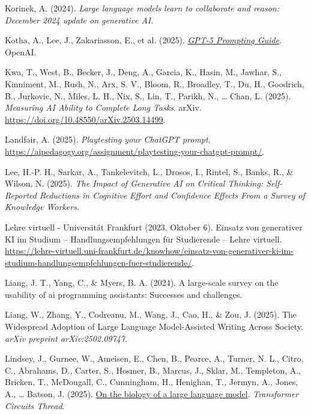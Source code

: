 \documentclass[
  ngerman,
  letterpaper,
  DIV=11]{scrreprt}
\newlength{\cslhangindent}
\newenvironment{CSLReferences}[2] %
 {\begin{list}{}{%
  \setlength{\itemindent}{0pt}
  \setlength{\leftmargin}{0pt}
  \setlength{\parsep}{0pt}
  \ifodd #1
   \setlength{\leftmargin}{\cslhangindent}
   \setlength{\itemindent}{-1\cslhangindent}
  \fi
  \setlength{\itemsep}{#2\baselineskip}}}
 {\end{list}}
\begin{document}
\begin{CSLReferences}{1}{0}
Korinek, A. (2024). \emph{Large language models learn to collaborate and
reason: December 2024 update on generative AI}.

Kotha, A., Lee, J., Zakariasson, E., et al. (2025).
\emph{\href{https://cookbook.openai.com/examples/gpt-5/gpt-5_prompting_guide}{GPT-5
Prompting Guide}}. OpenAI.

Kwa, T., West, B., Becker, J., Deng, A., Garcia, K., Hasin, M., Jawhar,
S., Kinniment, M., Rush, N., Arx, S. V., Bloom, R., Broadley, T., Du,
H., Goodrich, B., Jurkovic, N., Miles, L. H., Nix, S., Lin, T., Parikh,
N., \ldots{} Chan, L. (2025). \emph{Measuring AI Ability to Complete
Long Tasks}. arXiv. \url{https://doi.org/10.48550/arXiv.2503.14499}.

Landfair, A. (2025). \emph{Playtesting your ChatGPT prompt}.
\url{https://aipedagogy.org/assignment/playtesting-your-chatgpt-prompt/}.

Lee, H.-P. H., Sarkar, A., Tankelevitch, L., Drosos, I., Rintel, S.,
Banks, R., \& Wilson, N. (2025). \emph{The Impact of Generative AI on
Critical Thinking: Self-Reported Reductions in Cognitive Effort and
Confidence Effects From a Survey of Knowledge Workers}.

Lehre virtuell - Universität Frankfurt (2023, Oktober 6). Einsatz von
generativer KI im Studium -- Handlungsempfehlungen für Studierende --
Lehre virtuell.
\url{https://lehre-virtuell.uni-frankfurt.de/knowhow/einsatz-von-generativer-ki-im-studium-handlungsempfehlungen-fuer-studierende/}.

Liang, J. T., Yang, C., \& Myers, B. A. (2024). A large-scale survey on
the usability of ai programming assistants: Successes and challenges.

Liang, W., Zhang, Y., Codreanu, M., Wang, J., Cao, H., \& Zou, J.
(2025). The Widespread Adoption of Large Language Model-Assisted Writing
Across Society. \emph{arXiv preprint arXiv:2502.09747}.

Lindsey, J., Gurnee, W., Ameisen, E., Chen, B., Pearce, A., Turner, N.
L., Citro, C., Abrahams, D., Carter, S., Hosmer, B., Marcus, J., Sklar,
M., Templeton, A., Bricken, T., McDougall, C., Cunningham, H., Henighan,
T., Jermyn, A., Jones, A., \ldots{} Batson, J. (2025).
\href{https://transformer-circuits.pub/2025/attribution-graphs/biology.html}{On
the biology of a large language model}. \emph{Transformer Circuits
Thread}.


\end{CSLReferences}
\end{document}
